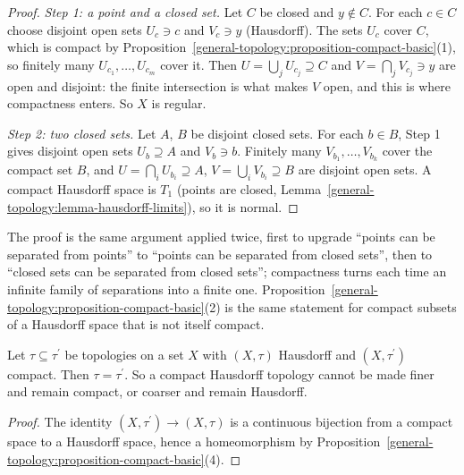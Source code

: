 \begin{proof}
\emph{Step 1: a point and a closed set.} Let $C$ be closed and $y \notin C$. For each $c \in C$ choose disjoint open sets $U_c \ni c$ and $V_c \ni y$ (Hausdorff). The sets $U_c$ cover $C$, which is compact by
Proposition~\ref{general-topology:proposition-compact-basic}(1), so finitely many $U_{c_1}, \ldots, U_{c_m}$ cover it. Then $U = \bigcup_jU_{c_j} \supseteq C$ and $V = \bigcap_jV_{c_j} \ni y$ are open and disjoint: the finite intersection is
what makes $V$ open, and this is where compactness enters. So $X$ is regular.

\emph{Step 2: two closed sets.} Let $A$, $B$ be disjoint closed sets. For each $b \in B$, Step 1 gives disjoint open sets $U_b \supseteq A$ and $V_b \ni b$. Finitely many $V_{b_1}, \ldots, V_{b_k}$ cover the compact set $B$, and
$U = \bigcap_iU_{b_i} \supseteq A$, $V = \bigcup_iV_{b_i} \supseteq B$ are disjoint open sets. A compact Hausdorff space is $T_1$ (points are closed, Lemma~\ref{general-topology:lemma-hausdorff-limits}), so it is normal.
\end{proof}

The proof is the same argument applied twice, first to upgrade ``points can be separated from points'' to ``points can be separated from closed sets'', then to ``closed sets can be separated from closed sets''; compactness turns each
time an infinite family of separations into a finite one. Proposition~\ref{general-topology:proposition-compact-basic}(2) is the same statement for compact subsets of a Hausdorff space that is not itself compact.

\begin{corollary}\label{general-topology:corollary-compact-hausdorff-topology}
Let $\tau \subseteq \tau^{\prime}$ be topologies on a set $X$ with $(X, \tau)$ Hausdorff and $(X, \tau^{\prime})$ compact. Then $\tau = \tau^{\prime}$. So a compact Hausdorff topology cannot be made finer and remain compact, or coarser and
remain Hausdorff.
\end{corollary}

\begin{proof}
The identity $(X, \tau^{\prime}) \to (X, \tau)$ is a continuous bijection from a compact space to a Hausdorff space, hence a homeomorphism by Proposition~\ref{general-topology:proposition-compact-basic}(4).
\end{proof}

